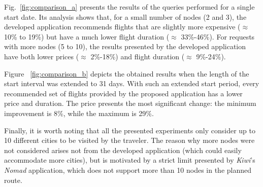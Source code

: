 Fig.~\ref{fig:comparison_a} presents the results of the queries performed for a single start date. Its analysis shows that, for a small number of nodes (2 and 3), the developed application recommends flights that are slightly more expensive ($\approx$ 10\% to 19\%) but have a much lower flight duration ($\approx$ 33\%-46\%). For requests with more nodes (5 to 10), the results presented by the developed application have both lower prices ($\approx$ 2\%-18\%) and flight duration ($\approx$ 9\%-24\%).

Figure ~\ref{fig:comparison_b} depicts the obtained results when the length of the start interval was extended to 31 days. With such an extended start period, every recommended set of flights provided by the proposed application has a lower price and duration. The price presents the most significant change: the minimum improvement is 8\%, while the maximum is 29\%.

Finally, it is worth noting that all the presented experiments only consider up to 10 different cities to be visited by the traveler. The reason why more nodes were not considered arises not from the developed application (which could easily accommodate more cities), but is motivated by a strict limit presented by \textit{Kiwi}'s \textit{Nomad} application, which does not support more than 10 nodes in the planned route.
  



